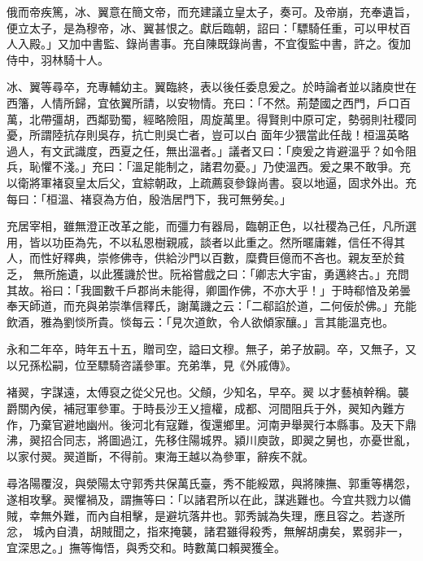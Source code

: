 \begin{pinyinscope}
 俄而帝疾篤，冰、翼意在簡文帝，而充建議立皇太子，奏可。及帝崩，充奉遺旨，便立太子，是為穆帝，冰、翼甚恨之。獻后臨朝，詔曰：「驃騎任重，可以甲杖百人入殿。」又加中書監、錄尚書事。充自陳既錄尚書，不宜復監中書，許之。復加侍中，羽林騎十人。



 冰、翼等尋卒，充專輔幼主。翼臨終，表以後任委息爰之。於時論者並以諸庾世在西籓，人情所歸，宜依翼所請，以安物情。充曰：「不然。荊楚國之西門，戶口百萬，北帶彊胡，西鄰勁蜀，經略險阻，周旋萬里。得賢則中原可定，勢弱則社稷同憂，所謂陸抗存則吳存，抗亡則吳亡者，豈可以白
 面年少猥當此任哉！桓溫英略過人，有文武識度，西夏之任，無出溫者。」議者又曰：「庾爰之肯避溫乎？如令阻兵，恥懼不淺。」充曰：「溫足能制之，諸君勿憂。」乃使溫西。爰之果不敢爭。充以衛將軍褚裒皇太后父，宜綜朝政，上疏薦裒參錄尚書。裒以地逼，固求外出。充每曰：「桓溫、褚裒為方伯，殷浩居門下，我可無勞矣。」



 充居宰相，雖無澄正改革之能，而彊力有器局，臨朝正色，以社稷為己任，凡所選用，皆以功臣為先，不以私恩樹親戚，談者以此重之。然所暱庸雜，信任不得其人，而性好釋典，崇修佛寺，供給沙門以百數，糜費巨億而不吝也。親友至於貧乏，
 無所施遺，以此獲譏於世。阮裕嘗戲之曰：「卿志大宇宙，勇邁終古。」充問其故。裕曰：「我圖數千戶郡尚未能得，卿圖作佛，不亦大乎！」于時郗愔及弟曇奉天師道，而充與弟崇準信釋氏，謝萬譏之云：「二郗諂於道，二何佞於佛。」充能飲酒，雅為劉惔所貴。惔每云：「見次道飲，令人欲傾家釀。」言其能溫克也。



 永和二年卒，時年五十五，贈司空，謚曰文穆。無子，弟子放嗣。卒，又無子，又以兄孫松嗣，位至驃騎咨議參軍。充弟準，見《外戚傳》。



 褚翜，字謀遠，太傅裒之從父兄也。父頠，少知名，早卒。翜
 以才藝楨幹稱。襲爵關內侯，補冠軍參軍。于時長沙王乂擅權，成都、河間阻兵于外，翜知內難方作，乃棄官避地幽州。後河北有寇難，復還鄉里。河南尹舉翜行本縣事。及天下鼎沸，翜招合同志，將圖過江，先移住陽城界。潁川庾敳，即翜之舅也，亦憂世亂，以家付翜。翜道斷，不得前。東海王越以為參軍，辭疾不就。



 尋洛陽覆沒，與滎陽太守郭秀共保萬氏臺，秀不能綏眾，與將陳撫、郭重等構怨，遂相攻擊。翜懼禍及，謂撫等曰：「以諸君所以在此，謀逃難也。今宜共戮力以備賊，幸無外難，而內自相擊，是避坑落井也。郭秀誠為失理，應且容之。若遂所忿，
 城內自潰，胡賊聞之，指來掩襲，諸君雖得殺秀，無解胡虜矣，累弱非一，宜深思之。」撫等悔悟，與秀交和。時數萬口賴翜獲全。




\end{pinyinscope}
